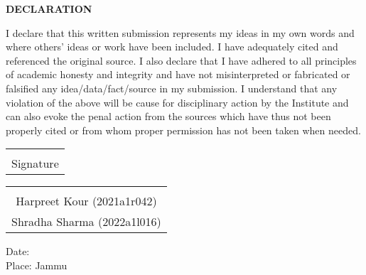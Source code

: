 
\newpage


 
\vspace*{0.05cm}
        
        \large
        \begin{center}
              \textbf{DECLARATION}\\
        \end{center}
      
        \vspace{0.1cm}
       
\begin{justify}
    I declare that this written submission represents my ideas in my own words and where others' ideas or work have been included. I have adequately cited and referenced the original source. I also declare that I have adhered to all principles of academic honesty and integrity and have not misinterpreted or fabricated or falsified any idea/data/fact/source in my submission. I understand that any violation of the above will be cause for disciplinary action by the Institute and can also evoke the penal action from the sources which have thus not been properly cited or from whom proper permission has not been taken when needed.
\end{justify}
   





\vspace{1cm}
\begin{table}[h]
\begin{flushright}
\begin{tabular}{c}
\hrulefill\\
\large Signature\\
\end{tabular}
\end{flushright}
\end{table}

\vspace{0.1cm}
\hfill
\begin{table}[h]
\begin{flushright}
\begin{tabular}{c}
\hrulefill\\
\large Harpreet Kour (2021a1r042)\\
\large Shradha Sharma (2022a1l016)\\


\end{tabular}
\end{flushright}
\end{table}



\begin{flushleft}
{\large Date:}\\
{\large Place: Jammu}
\end{flushleft}
\vspace{10cm}
